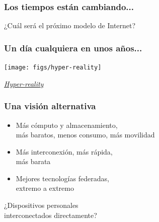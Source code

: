 \documentclass[17pt,aspectratio=169]{beamer}
\begin{document}
\begin{frame}[fragile]
  \frametitle{Los tiempos están cambiando...}


  ¿Cuál será el próximo modelo de Internet?
  
\end{frame}

\begin{frame}[fragile]
\frametitle{Un día cualquiera en unos años...}

  \begin{center}
  \texttt{[image: figs/hyper-reality]}
  \end{center}

  \begin{flushright}
    {\em \tiny
      \href{https://www.youtube.com/watch?v=YJg02ivYzSs}{Hyper-reality}}
  \end{flushright}
  
\end{frame}


\begin{frame}
\frametitle{Una visión alternativa}

\begin{itemize}
\item Más cómputo y almacenamiento, \\
  más baratos, menos consumo, más movilidad \\
\item Más interconexión, más rápida, \\
  más barata \\
\item Mejores tecnologías federadas, \\
  extremo a extremo \\
\end{itemize}

  \begin{flushright}
  ¿Dispositivos personales \\
  interconectados directamente? \\
  \end{flushright}

\end{frame}

\end{document}
